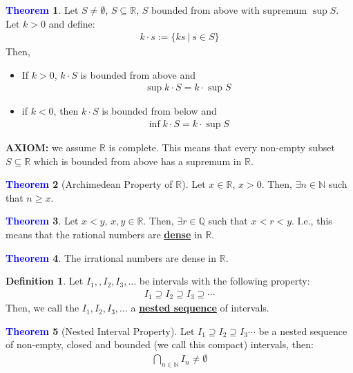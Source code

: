 \documentclass[11pt]{article}
\theoremstyle{definition}
\newcommand{\R}[0]{\mathbb{R}}
\newcommand{\dfn}[1]{\textbf{{\underline{#1}}}}
\newtheorem{theorem}{\textcolor{blue}{Theorem}}
\theoremstyle{definition}
\newtheorem{definition}{\textcolor{OliveGreen}{Definition}}
\theoremstyle{remark}
\begin{document}
\begin{theorem}
	Let $S \neq \emptyset$, $S \subseteq \R$, $S$ bounded from above with supremum $\sup{S}$. Let $k >0$ and define: 
	\begin{align*}
		k \cdot s := \{ ks\ |\ s \in S \} 
	\end{align*}
	Then, 
	\begin{itemize}[noitemsep]
		\item If $k > 0$, $k \cdot S$ is bounded from above and
		\begin{align}
			\sup{k \cdot S} = k \cdot \sup{S} 		
		\end{align}
		\item if $k < 0$, then $k \cdot S$ is bounded from below and 
		\begin{align}
			\inf{k \cdot S} = k \cdot \sup{S} 	
		\end{align}
	\end{itemize}
\end{theorem}

\textbf{AXIOM:} we assume $\R$ is complete. This means that every non-empty subset $S \subseteq \R$ which is bounded from above has a supremum in $\R$.
\begin{theorem}[Archimedean Property of $\R$]
	Let $x \in \R$, $x > 0$. Then, $\exists n \in \mathbb{N}$ such that $n \geq x$.
\end{theorem}

\begin{theorem}
	Let $x < y$, $x, y \in \R$. Then, $\exists r \in \mathbb{Q}$ such that $x < r < y$. I.e., this means that the rational numbers are \dfn{dense} in $\R$.
\end{theorem}

\begin{theorem}
	The irrational numbers are dense in $\R$.
\end{theorem}

\begin{definition}
	Let $I_1, , I_2, I_3,...$ be intervals with the following property:
	\begin{align*}
		I_1 \supseteq I_2 \supseteq I_3 \supseteq \cdots 
	\end{align*}
	Then, we call the $I_1, I_2, I_3,...$ a \dfn{nested sequence} of intervals.
\end{definition}


\begin{theorem}[Nested Interval Property]
	Let $I_1 \supseteq I_2 \supseteq I_3 \cdots$ be a nested sequence of non-empty, closed and bounded (we call this compact) intervals, then: 
	\begin{align}
		\bigcap_{n \in \mathbb{N}} I_n \neq \emptyset	
	\end{align}
\end{theorem}
\end{document}
